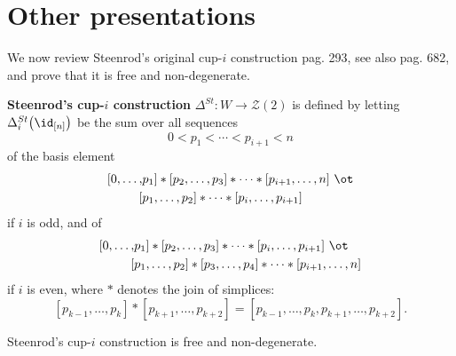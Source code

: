 
\section{Other presentations} \label{s:other presentations}

We now review Steenrod's original cup-$i$ construction \cite{steenrod1947products} pag. 293, see also \cite{mcclure2003multivariable} pag. 682, and prove that it is free and non-degenerate.

\begin{definition}
	\textbf{Steenrod's cup-$i$ construction} $\Delta^{St} \colon W \to \mathcal{Z}(2)$ is defined by letting $\Delta_i^{St} \big( \id_{[n]} \big)$ be the sum over all sequences
	\[
	0 < p_1 < \cdots < p_{i+1} < n
	\]
	of the basis element
	\begin{equation} \label{equation: steenrod original i odd}
	\begin{split}
	[ 0, \dots, &{p_1} ] \ast [ {p_2}, \dots, {p_3} ] \ast \cdots \ast [ {p_{i+1}}, \dots, n ]\ \ot \\
	[ &{p_1}, \dots, {p_2} ] \ast \cdots \ast [ {p_{i}}, \dots, {p_{i+1}} ]
	\end{split}
	\end{equation}
	if $i$ is odd, and of
	\begin{equation} \label{equation: steenrod original i even}
	\begin{split}
	[ 0, \dots, &{p_1} ] \ast [ {p_2}, \dots, {p_3} ] \ast \cdots \ast [ {p_{i}}, \dots, {p_{i+1}} ]\ \ot \\
	[ &{p_1}, \dots, {p_2} ] \ast [ {p_3}, \dots, {p_4} ] \ast \cdots \ast [ {p_{i+1}}, \dots, n ]
	\end{split}
	\end{equation}
	if $i$ is even, where $\ast$ denotes the join of simplices:
	\[
	[{p_{k-1}}, \dots, {p_{k}} ] \ast [ {p_{k+1}}, \dots, p_{k+2}] = [{p_{k-1}}, \dots, p_k, p_{k+1}, \dots, p_{k+2}].
	\]
\end{definition}

\begin{proposition}
	Steenrod's cup-$i$ construction is free and non-degenerate.
\end{proposition}

